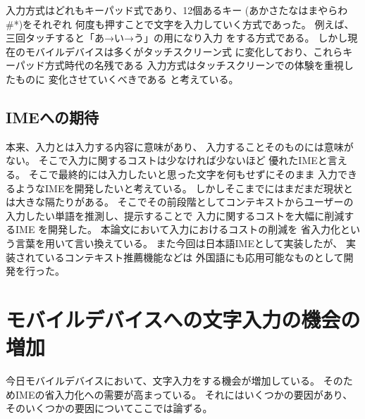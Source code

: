 入力方式はどれもキーパッド式であり、12個あるキー
(あかさたなはまやらわ\#*)をそれぞれ
何度も押すことで文字を入力していく方式であった。
例えば、三回タッチすると「あ→い→う」の用になり入力
をする方式である。
しかし現在のモバイルデバイスは多くがタッチスクリーン式
に変化しており、これらキーパッド方式時代の名残である
入力方式はタッチスクリーンでの体験を重視したものに
変化させていくべきである\cite{designinginterface}
と考えている。

\subsection{IMEへの期待}
本来、入力とは入力する内容に意味があり、
入力することそのものには意味がない。
そこで入力に関するコストは少なければ少ないほど
優れたIMEと言える。
そこで最終的には入力したいと思った文字を何もせずにそのまま
入力できるようなIMEを開発したいと考えている。
しかしそこまでにはまだまだ現状とは大きな隔たりがある。
そこでその前段階としてコンテキストからユーザーの
入力したい単語を推測し、提示することで
入力に関するコストを大幅に削減するIME
を開発した。
本論文において入力におけるコストの削減を
省入力化という言葉を用いて言い換えている。
また今回は日本語IMEとして実装したが、
実装されているコンテキスト推薦機能などは
外国語にも応用可能なものとして開発を行った。

\section{モバイルデバイスへの文字入力の機会の増加}
今日モバイルデバイスにおいて、文字入力をする機会が増加している。
そのためIMEの省入力化への需要が高まっている。
それにはいくつかの要因があり、
そのいくつかの要因についてここでは論ずる。

